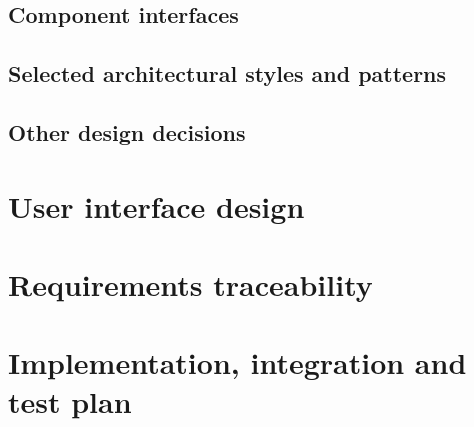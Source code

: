 \documentclass[a4paper,oneside,11pt]{article}
\begin{document}
        \subsection{Component interfaces}
            
        \subsection{Selected architectural styles and patterns}
            
        \subsection{Other design decisions}
            
        
    \newpage
    \section{User interface design}
        
    \newpage
    \newpage
    \section{Requirements traceability}
        
    \newpage
    \section{Implementation, integration and test plan}
        

    \newpage
    
\end{document}

